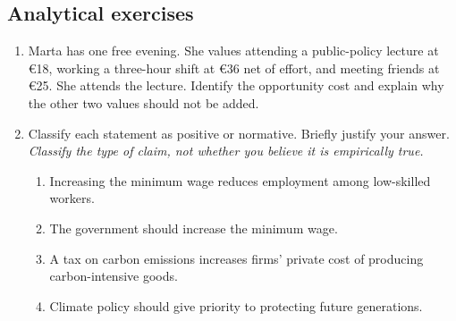 \subsection*{Analytical exercises}
\begin{enumerate}[resume,label=\arabic*.]
  \item Marta has one free evening. She values attending a public-policy lecture at \euro18, working a three-hour shift at \euro36 net of effort, and meeting friends at \euro25. She attends the lecture. Identify the opportunity cost and explain why the other two values should not be added.
  \item Classify each statement as positive or normative. Briefly justify your answer.
  \textit{Classify the type of claim, not whether you believe it is empirically true.}
  \begin{enumerate}[label=(\alph*)]
    \item Increasing the minimum wage reduces employment among low-skilled workers.
    \item The government should increase the minimum wage.
    \item A tax on carbon emissions increases firms' private cost of producing carbon-intensive goods.
    \item Climate policy should give priority to protecting future generations.
  \end{enumerate}
\end{enumerate}

